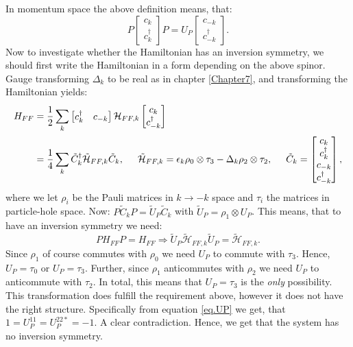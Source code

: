 In momentum space the above definition means, that:
\begin{equation}
P\begin{bmatrix} c_k \\ c^\dagger_k \end{bmatrix} P = U_P\begin{bmatrix} c_{-k} \\ c^\dagger_{-k} \end{bmatrix}.
\end{equation}
Now to investigate whether the Hamiltonian has an inversion symmetry, we should first write the Hamiltonian in a form depending on the above spinor. Gauge transforming $\Delta_k$ to be real as in chapter \ref{Chapter7}, and transforming the Hamiltonian yields:
\begin{align}
H_{FF} &= \frac{1}{2}\sum_k \begin{bmatrix} c_k^\dagger & c_{-k}\end{bmatrix}\mathcal{H}_{FF,k} \begin{bmatrix} c_k \\ c^\dagger_{-k}\end{bmatrix} \nonumber \\
	   &= \frac{1}{4}\sum_k \tilde{C}^\dagger_k \tilde{\mathcal{H}}_{FF,k} \tilde{C}_k, \hspace{0.5cm} \tilde{\mathcal{H}}_{FF,k} = \epsilon_k \rho_0 \otimes \tau_3 - \Delta_k \rho_2 \otimes \tau_2, \hspace{0.5cm} \tilde{C}_k = \begin{bmatrix} c_k \\ c^\dagger_{k} \\ c_{-k} \\ c^\dagger_{-k}\end{bmatrix}, 
\end{align}
where we let $\rho_i$ be the Pauli matrices in $k\to -k$ space and $\tau_i$ the matrices in particle-hole space. Now: $P\tilde{C}_kP = \tilde{U}_P \tilde{C}_k$ with $\tilde{U}_P = \rho_1\otimes U_P$. This means, that to have an inversion symmetry we need:
\begin{equation}
PH_{FF}P = H_{FF} \Rightarrow \tilde{U}_P\tilde{\mathcal{H}}_{FF,k}\tilde{U}_P = \tilde{\mathcal{H}}_{FF,k}. \nonumber 
\end{equation}
Since $\rho_1$ of course commutes with $\rho_0$ we need $U_P$ to commute with $\tau_3$. Hence, $U_P = \tau_0$ or $U_P = \tau_3$. Further, since $\rho_1$ anticommutes with $\rho_2$ we need $U_P$ to anticommute with $\tau_2$. In total, this means that $U_P = \tau_3$ is the \textit{only} possibility. This transformation does fulfill the requirement above, however it does not have the right structure. Specifically from equation \ref{eq.UP} we get, that $1 = U_P^{11} = U_P^{22*} = -1$. A clear contradiction. Hence, we get that the system has no inversion symmetry. 

